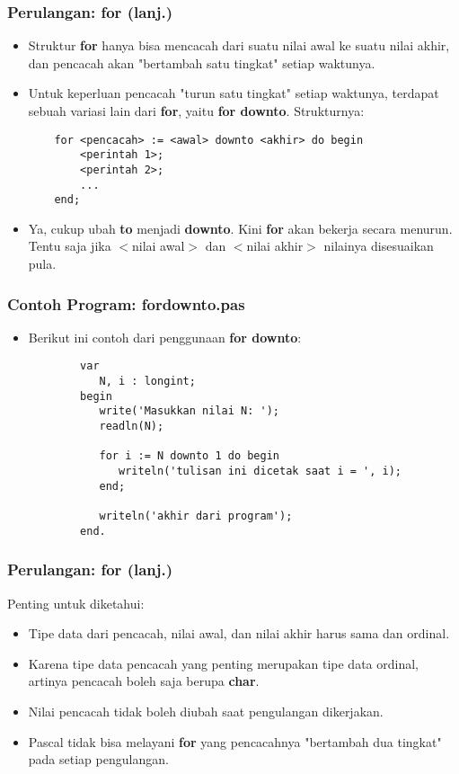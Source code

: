 \documentclass{beamer}
\begin{document}
\begin{frame}[fragile]
\frametitle{Perulangan: for (lanj.)}
\begin{itemize}
	\item Struktur \textbf{for} hanya bisa mencacah dari suatu nilai awal ke suatu nilai akhir, dan pencacah akan "bertambah satu tingkat" setiap waktunya.
	\item Untuk keperluan pencacah "turun satu tingkat" setiap waktunya, terdapat sebuah variasi lain dari \textbf{for}, yaitu \textbf{for downto}. Strukturnya:
	\begin{lstlisting}
	for <pencacah> := <awal> downto <akhir> do begin
	    <perintah 1>;
	    <perintah 2>;
	    ...
	end;
	\end{lstlisting}
	\item Ya, cukup ubah \alert{\textbf{to}} menjadi \alert{\textbf{downto}}. Kini \textbf{for} akan bekerja secara menurun. Tentu saja jika $<$nilai awal$>$ dan $<$nilai akhir$>$ nilainya disesuaikan pula.
\end{itemize}
\end{frame}

\begin{frame}[fragile]
\frametitle{Contoh Program: fordownto.pas}
\begin{itemize}
	\item Berikut ini contoh dari penggunaan \textbf{for downto}:
	\begin{lstlisting}
		var
		   N, i : longint;
		begin
		   write('Masukkan nilai N: ');
		   readln(N);
		
		   for i := N downto 1 do begin
		      writeln('tulisan ini dicetak saat i = ', i);
		   end;
		
		   writeln('akhir dari program');
		end.
	\end{lstlisting}
\end{itemize}
\end{frame}

\begin{frame}
\frametitle{Perulangan: for (lanj.)}
Penting untuk diketahui:
\begin{itemize}
	\item Tipe data dari pencacah, nilai awal, dan nilai akhir harus sama dan \alert{ordinal}.
	\item Karena tipe data pencacah yang penting merupakan tipe data ordinal, artinya pencacah boleh saja berupa \textbf{char}.
	\item Nilai pencacah tidak boleh diubah saat pengulangan dikerjakan.
	\item Pascal tidak bisa melayani \textbf{for} yang pencacahnya "bertambah dua tingkat" pada setiap pengulangan.
\end{itemize}
\end{frame}
\end{document}
